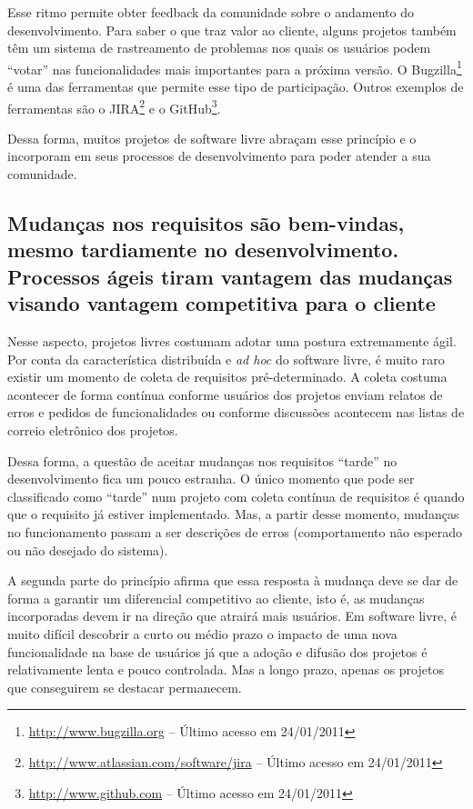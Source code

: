 Esse ritmo permite obter feedback da comunidade sobre o andamento do
desenvolvimento. Para saber o que traz valor ao cliente, alguns
projetos também têm um sistema de rastreamento de problemas nos quais
os usuários podem ``votar'' nas funcionalidades mais importantes para
a próxima versão. O Bugzilla\footnote{\url{http://www.bugzilla.org} --
  Último acesso em 24/01/2011} é uma das ferramentas que permite esse
tipo de participação. Outros exemplos de ferramentas são o
JIRA\footnote{\url{http://www.atlassian.com/software/jira} -- Último
  acesso em 24/01/2011} e o
GitHub\footnote{\url{http://www.github.com} -- Último acesso em
  24/01/2011}.

Dessa forma, muitos projetos de software livre abraçam esse princípio
e o incorporam em seus processos de desenvolvimento para poder atender
a sua comunidade.

\subsection[Aceitar as mudanças]{Mudanças nos requisitos são
  bem-vindas, mesmo tardiamente no desenvolvimento.  Processos ágeis
  tiram vantagem das mudanças visando vantagem competitiva para o
  cliente}

Nesse aspecto, projetos livres costumam adotar uma postura
extremamente ágil. Por conta da característica distribuída e
\textit{ad hoc} do software livre, é muito raro existir um momento de
coleta de requisitos pré-determinado. A coleta costuma acontecer de
forma contínua conforme usuários dos projetos enviam relatos de erros
e pedidos de funcionalidades ou conforme discussões acontecem nas
listas de correio eletrônico dos projetos.

Dessa forma, a questão de aceitar mudanças nos requisitos ``tarde'' no
desenvolvimento fica um pouco estranha. O único momento que pode ser
classificado como ``tarde'' num projeto com coleta contínua de
requisitos é quando que o requisito já estiver implementado. Mas, a
partir desse momento, mudanças no funcionamento passam a ser
descrições de erros (comportamento não esperado ou não desejado do
sistema).

A segunda parte do princípio afirma que essa resposta à mudança deve
se dar de forma a garantir um diferencial competitivo ao cliente, isto
é, as mudanças incorporadas devem ir na direção que atrairá mais
usuários. Em software livre, é muito difícil descobrir a curto ou
médio prazo o impacto de uma nova funcionalidade na base de usuários
já que a adoção e difusão dos projetos é relativamente lenta e pouco
controlada. Mas a longo prazo, apenas os projetos que conseguirem se
destacar permanecem.

